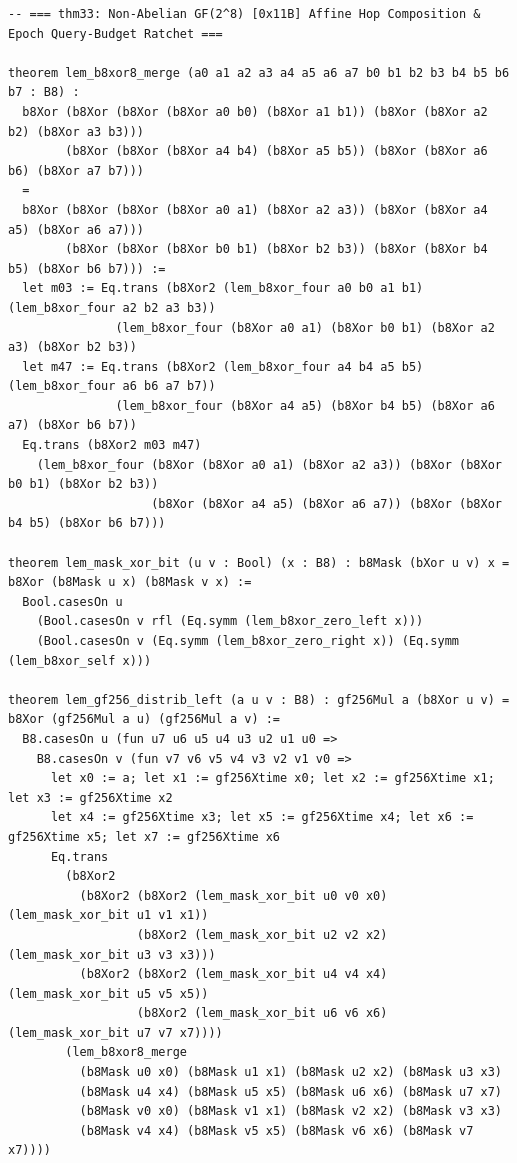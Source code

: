 \documentclass[10pt,twocolumn]{article}
\theoremstyle{spectralthm}
\begin{document}
\begin{lstlisting}[language=Lean4,caption={Standalone Pure Init.Prelude Term-Mode Lean 4 Expansion (thm30--thm37, v1.1.0, 0 sorry, 0 axioms).},label={lst:lean_v110}]
-- === thm33: Non-Abelian GF(2^8) [0x11B] Affine Hop Composition & Epoch Query-Budget Ratchet ===

theorem lem_b8xor8_merge (a0 a1 a2 a3 a4 a5 a6 a7 b0 b1 b2 b3 b4 b5 b6 b7 : B8) :
  b8Xor (b8Xor (b8Xor (b8Xor a0 b0) (b8Xor a1 b1)) (b8Xor (b8Xor a2 b2) (b8Xor a3 b3)))
        (b8Xor (b8Xor (b8Xor a4 b4) (b8Xor a5 b5)) (b8Xor (b8Xor a6 b6) (b8Xor a7 b7)))
  =
  b8Xor (b8Xor (b8Xor (b8Xor a0 a1) (b8Xor a2 a3)) (b8Xor (b8Xor a4 a5) (b8Xor a6 a7)))
        (b8Xor (b8Xor (b8Xor b0 b1) (b8Xor b2 b3)) (b8Xor (b8Xor b4 b5) (b8Xor b6 b7))) :=
  let m03 := Eq.trans (b8Xor2 (lem_b8xor_four a0 b0 a1 b1) (lem_b8xor_four a2 b2 a3 b3))
               (lem_b8xor_four (b8Xor a0 a1) (b8Xor b0 b1) (b8Xor a2 a3) (b8Xor b2 b3))
  let m47 := Eq.trans (b8Xor2 (lem_b8xor_four a4 b4 a5 b5) (lem_b8xor_four a6 b6 a7 b7))
               (lem_b8xor_four (b8Xor a4 a5) (b8Xor b4 b5) (b8Xor a6 a7) (b8Xor b6 b7))
  Eq.trans (b8Xor2 m03 m47)
    (lem_b8xor_four (b8Xor (b8Xor a0 a1) (b8Xor a2 a3)) (b8Xor (b8Xor b0 b1) (b8Xor b2 b3))
                    (b8Xor (b8Xor a4 a5) (b8Xor a6 a7)) (b8Xor (b8Xor b4 b5) (b8Xor b6 b7)))

theorem lem_mask_xor_bit (u v : Bool) (x : B8) : b8Mask (bXor u v) x = b8Xor (b8Mask u x) (b8Mask v x) :=
  Bool.casesOn u
    (Bool.casesOn v rfl (Eq.symm (lem_b8xor_zero_left x)))
    (Bool.casesOn v (Eq.symm (lem_b8xor_zero_right x)) (Eq.symm (lem_b8xor_self x)))

theorem lem_gf256_distrib_left (a u v : B8) : gf256Mul a (b8Xor u v) = b8Xor (gf256Mul a u) (gf256Mul a v) :=
  B8.casesOn u (fun u7 u6 u5 u4 u3 u2 u1 u0 =>
    B8.casesOn v (fun v7 v6 v5 v4 v3 v2 v1 v0 =>
      let x0 := a; let x1 := gf256Xtime x0; let x2 := gf256Xtime x1; let x3 := gf256Xtime x2
      let x4 := gf256Xtime x3; let x5 := gf256Xtime x4; let x6 := gf256Xtime x5; let x7 := gf256Xtime x6
      Eq.trans
        (b8Xor2
          (b8Xor2 (b8Xor2 (lem_mask_xor_bit u0 v0 x0) (lem_mask_xor_bit u1 v1 x1))
                  (b8Xor2 (lem_mask_xor_bit u2 v2 x2) (lem_mask_xor_bit u3 v3 x3)))
          (b8Xor2 (b8Xor2 (lem_mask_xor_bit u4 v4 x4) (lem_mask_xor_bit u5 v5 x5))
                  (b8Xor2 (lem_mask_xor_bit u6 v6 x6) (lem_mask_xor_bit u7 v7 x7))))
        (lem_b8xor8_merge
          (b8Mask u0 x0) (b8Mask u1 x1) (b8Mask u2 x2) (b8Mask u3 x3)
          (b8Mask u4 x4) (b8Mask u5 x5) (b8Mask u6 x6) (b8Mask u7 x7)
          (b8Mask v0 x0) (b8Mask v1 x1) (b8Mask v2 x2) (b8Mask v3 x3)
          (b8Mask v4 x4) (b8Mask v5 x5) (b8Mask v6 x6) (b8Mask v7 x7))))


\end{lstlisting}
\end{document}
